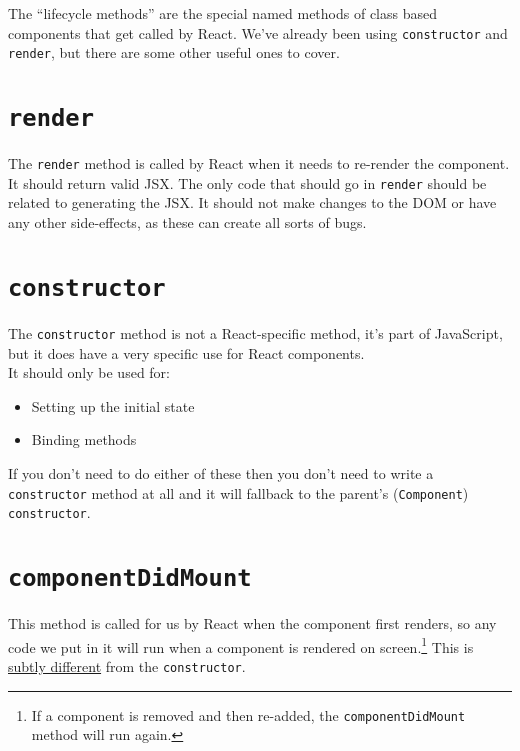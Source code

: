 The ``lifecycle methods'' are the special named methods of class based components that get called by React. We've already been using \texttt{constructor} and \texttt{render}, but there are some other useful ones to cover.


\section{\texttt{render}}

The \texttt{render} method is called by React when it needs to re-render the component. It should return valid JSX. The only code that should go in \texttt{render} should be related to generating the JSX. It should not make changes to the DOM or have any other side-effects, as these can create all sorts of bugs.


\section{\texttt{constructor}}

The \texttt{constructor} method is not a React-specific method, it's part of JavaScript, but it does have a very specific use for React components.
\\

It should only be used for:

\begin{itemize}
    \item Setting up the initial state
    \item Binding methods
\end{itemize}

If you don't need to do either of these then you don't need to write a \texttt{constructor} method at all and it will fallback to the parent's (\texttt{Component}) \texttt{constructor}.


\section{\texttt{componentDidMount}}

This method is called for us by React when the component first renders, so any code we put in it will run when a component is rendered on screen.\footnote{If a component is removed and then re-added, the \texttt{componentDidMount} method will run again.} This is \href{https://medium.com/@mahcloud/actions-in-the-constructor-or-componentdidmount-be3720e4a9a6}{subtly different} from the \texttt{constructor}.
\\

